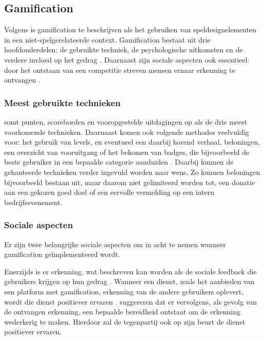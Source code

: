 \subsection{Gamification}

Volgens \textcite{Deterding2011} is gamification te beschrijven als het gebruiken van speldesignelementen in een niet-spelgerelateerde context. Gamification bestaat uit drie hoofdonderdelen: de gebruikte techniek, de psychologische uitkomsten en de verdere invloed op het gedrag \autocite{Hamari2014}. Daarnaast zijn sociale aspecten ook essentieel: door het ontstaan van een competitie streven mensen ernaar erkenning te ontvangen \autocite{Hamari2013}.

\subsubsection{Meest gebruikte technieken}

\textcite{Hamari2014} somt punten, scoreborden en vooropgestelde uitdagingen op als de drie \linebreak meest voorkomende technieken. Daarnaast komen ook volgende methodes veelvuldig voor: het gebruik van levels, en eventueel een daarbij horend verhaal, beloningen, een overzicht van vooruitgang of het bekomen van badges, die bijvoorbeeld de beste gebruiker in een bepaalde categorie aanduiden \autocite{Dong2012,Flatla2011,Li2012}.
Daarbij kunnen de gehanteerde technieken verder ingevuld worden naar wens. Zo kunnen beloningen bijvoorbeeld bestaan uit, maar daarom niet gelimiteerd worden tot, een donatie aan een gekozen goed doel of een eervolle vermelding op een intern bedrijfsevenement.

\subsubsection{Sociale aspecten}

Er zijn twee belangrijke sociale aspecten om in acht te nemen wanneer gamification geïmplementeerd wordt.

Enerzijds is er erkenning, wat beschreven kan worden als de sociale feedback die gebruikers krijgen op hun gedrag \autocite{Cheung2011}.
Wanneer een dienst, zoals het aanbieden van een platform met gamification, erkenning van de andere gebruikers oplevert, wordt die dienst positiever ervaren \autocite{Preece2001}.
\textcite{Hamari2013} suggereren dat er vervolgens, als gevolg van de ontvangen erkenning, een bepaalde bereidheid ontstaat om de erkenning wederkerig te maken. Hierdoor zal de tegenpartij ook op zijn beurt de dienst positiever ervaren.

